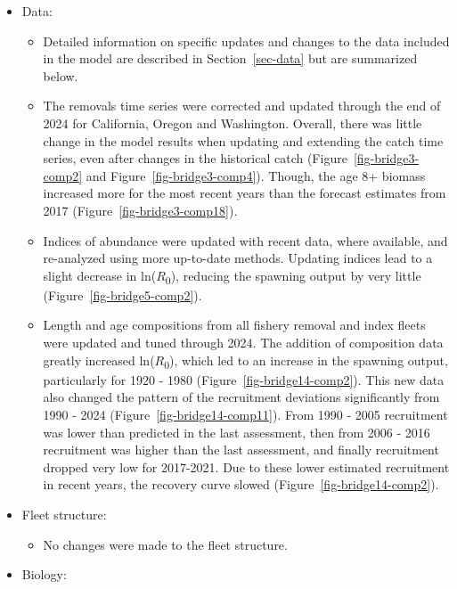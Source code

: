 \documentclass[
]{scrartcl}
\providecommand{\tightlist}{%
  \setlength{\itemsep}{0pt}\setlength{\parskip}{0pt}}\usepackage{longtable,booktabs,array}
\begin{document}
\begin{itemize}
\tightlist
\item
  Data:

  \begin{itemize}
  \tightlist
  \item
    Detailed information on specific updates and changes to the data
    included in the model are described in Section~\ref{sec-data} but
    are summarized below.
  \item
    The removals time series were corrected and updated through the end
    of 2024 for California, Oregon and Washington. Overall, there was
    little change in the model results when updating and extending the
    catch time series, even after changes in the historical catch
    (Figure~\ref{fig-bridge3-comp2} and Figure~\ref{fig-bridge3-comp4}).
    Though, the age 8+ biomass increased more for the most recent years
    than the forecast estimates from 2017
    (Figure~\ref{fig-bridge3-comp18}).
  \item
    Indices of abundance were updated with recent data, where available,
    and re-analyzed using more up-to-date methods. Updating indices lead
    to a slight decrease in ln(\(R\)\textsubscript{0}), reducing the
    spawning output by very little (Figure~\ref{fig-bridge5-comp2}).
  \item
    Length and age compositions from all fishery removal and index
    fleets were updated and tuned through 2024. The addition of
    composition data greatly increased ln(\(R\)\textsubscript{0}), which
    led to an increase in the spawning output, particularly for 1920 -
    1980 (Figure~\ref{fig-bridge14-comp2}). This new data also changed
    the pattern of the recruitment deviations significantly from 1990 -
    2024 (Figure~\ref{fig-bridge14-comp11}). From 1990 - 2005
    recruitment was lower than predicted in the last assessment, then
    from 2006 - 2016 recruitment was higher than the last assessment,
    and finally recruitment dropped very low for 2017-2021. Due to these
    lower estimated recruitment in recent years, the recovery curve
    slowed (Figure~\ref{fig-bridge14-comp2}).
  \end{itemize}
\item
  Fleet structure:

  \begin{itemize}
  \tightlist
  \item
    No changes were made to the fleet structure.
  \end{itemize}
\item
  Biology:


\end{itemize}
\end{document}
